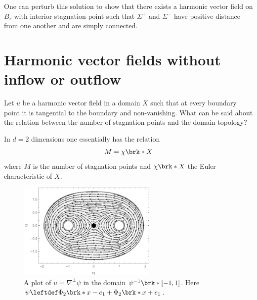 \begin{frame}
  One can perturb this solution to show that there exists a harmonic vector field
  on $B_r$ with interior stagnation point such that $\Sigma^+$ and $\Sigma^-$ have positive distance
  from one another and are simply connected.
\end{frame}

\section{Harmonic vector fields without inflow or outflow}

\begin{frame}
  \begin{question}
    Let $u$ be a harmonic vector field in a domain $X$ such that at every boundary point it is tangential to the boundary
    and non-vanishing.
    What can be said about the relation between the number of stagnation points and the domain topology?
  \end{question}
\end{frame}

\begin{frame}
  In $d=2$ dimensions one essentially has the relation
  \begin{align*}
    M=\chi\brk*{X}
  \end{align*}
  where $M$ is the number of stagnation points and $\chi\brk*{X}$ the Euler characteristic of $X$.
\end{frame}

\begin{frame}
  \begin{figure}
    \centering
    \includegraphics[width=0.6\textwidth]{../Plots/n2_hvf_noInflowNoOutflow_symmetric_gray_2.pdf}
    \caption{A plot of $u=\nabla^\perp\psi$ in the domain $\psi^{-1}\brk*{[-1,1]}$.
      Here $\psi\leftdef\Phi_2\brk*{x-e_1}+\Phi_2\brk*{x+e_1}$.}
    \label{pl:n2_hvf_noInflowNoOutflow}
  \end{figure}
\end{frame}

